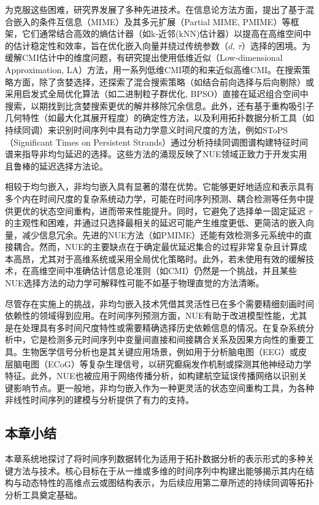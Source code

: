 为克服这些困难，研究界发展了多种先进技术。在信息论方法方面，提出了基于混合嵌入的条件互信息（MIME）及其多元扩展（Partial MIME, PMIME）等框架，它们通常结合高效的熵估计器（如k-近邻(kNN)估计器）以提高在高维空间中的估计稳定性和效率，旨在优化嵌入向量并绕过传统参数（$d$, $\tau$）选择的困境。为缓解CMI估计中的维度问题，有研究提出使用低维近似（Low-dimensional Approximation, LA）方法，用一系列低维CMI项的和来近似高维CMI。在搜索策略方面，除了贪婪选择，还探索了混合搜索策略（如结合前向选择与后向剔除）或采用启发式全局优化算法（如二进制粒子群优化, BPSO）直接在延迟组合空间中搜索，以期找到比贪婪搜索更优的解并移除冗余信息。此外，还有基于重构吸引子几何特性（如最大化其展开程度）的确定性方法，以及利用拓扑数据分析工具（如持续同调）来识别时间序列中具有动力学意义时间尺度的方法，例如SToPS（Significant Times on Persistent Strands）通过分析持续同调图谱构建特征时间谱来指导非均匀延迟的选择。这些方法的涌现反映了NUE领域正致力于开发实用且鲁棒的延迟选择方法论。

相较于均匀嵌入，非均匀嵌入具有显著的潜在优势。它能够更好地适应和表示具有多个内在时间尺度的复杂系统动力学，可能在时间序列预测、耦合检测等任务中提供更优的状态空间重构，进而带来性能提升。同时，它避免了选择单一固定延迟 $\tau$ 的主观性和困难，并通过只选择最相关的延迟可能产生维度更低、更简洁的嵌入向量，减少信息冗余。先进的NUE方法（如PMIME）还能有效检测多元系统中的直接耦合。然而，NUE的主要缺点在于确定最优延迟集合的过程非常复杂且计算成本高昂，尤其对于高维系统或采用全局优化策略时。此外，若未使用有效的缓解技术，在高维空间中准确估计信息论准则（如CMI）仍然是一个挑战，并且某些NUE选择方法的动力学可解释性可能不如基于物理直觉的方法清晰。

尽管存在实施上的挑战，非均匀嵌入技术凭借其灵活性已在多个需要精细刻画时间依赖性的领域得到应用。在时间序列预测方面，NUE有助于改进模型性能，尤其是在处理具有多时间尺度特性或需要精确选择历史依赖信息的情况。在复杂系统分析中，它是检测多元时间序列中变量间直接和间接耦合关系及因果方向性的重要工具。生物医学信号分析也是其关键应用场景，例如用于分析脑电图（EEG）或皮层脑电图（ECoG）等复杂生理信号，以研究癫痫发作机制或探测其他神经动力学特征。此外，NUE也被应用于网络传播分析，如构建航空延误传播网络以识别关键影响节点。更一般地，非均匀嵌入作为一种更灵活的状态空间重构工具，为各种非线性时间序列的建模与分析提供了有力的支持。

\subsection{本章小结}
本章系统地探讨了将时间序列数据转化为适用于拓扑数据分析的表示形式的多种关键方法与技术。核心目标在于从一维或多维的时间序列中构建出能够揭示其内在结构与动态特性的高维点云或图结构表示，为后续应用第二章所述的持续同调等拓扑分析工具奠定基础。

